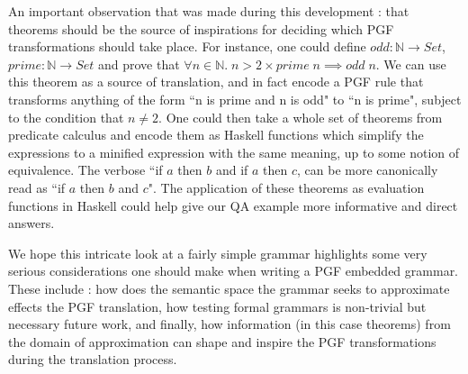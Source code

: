 An important observation that was made during this development : that theorems
should be the source of inspirations for deciding which PGF transformations
should take place. For instance, one could define $odd : \mathds{N}
\rightarrow Set$, $prime : \mathds{N} \rightarrow Set$ and prove that $\forall n
\in \mathds{N}.\; n > 2 \times prime\; n \implies odd\; n$. We can use this
theorem as a source of translation, and in fact encode a PGF rule that
transforms anything of the form ``n is prime and n is odd" to ``n is prime",
subject to the condition that $n \neq 2$. One could then take a whole set of
theorems from predicate calculus and encode them as Haskell functions which
simplify the expressions to a minified expression with the
same meaning, up to some notion of equivalence. The verbose ``if $a$ then $b$
and if $a$ then $c$, can be more canonically read as ``if $a$ then $b$ and $c$".
The application of these theorems as evaluation functions in Haskell could
help give our QA example more informative and direct answers.

We hope this intricate look at a fairly simple grammar highlights some very
serious considerations one should make when writing a PGF embedded grammar.
These include : how does the semantic space the grammar seeks to approximate
effects the PGF translation, how testing formal grammars is non-trivial but
necessary future work, and finally, how information (in this case theorems) from
the domain of approximation can shape and inspire the PGF transformations 
during the translation process.
